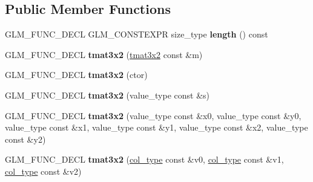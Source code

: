 \subsection*{Public Member Functions}
\begin{DoxyCompactItemize}
\item 
\hypertarget{structglm_1_1detail_1_1tmat3x2_a05bdf3c70f4246d2dad53a1fd3c09125}{}G\+L\+M\+\_\+\+F\+U\+N\+C\+\_\+\+D\+E\+C\+L G\+L\+M\+\_\+\+C\+O\+N\+S\+T\+E\+X\+P\+R size\+\_\+type {\bfseries length} () const \label{structglm_1_1detail_1_1tmat3x2_a05bdf3c70f4246d2dad53a1fd3c09125}

\item 
\hypertarget{structglm_1_1detail_1_1tmat3x2_aa5dbea756ecc0eeec0f8216ca548ad7f}{}G\+L\+M\+\_\+\+F\+U\+N\+C\+\_\+\+D\+E\+C\+L {\bfseries tmat3x2} (\hyperlink{structglm_1_1detail_1_1tmat3x2}{tmat3x2} const \&m)\label{structglm_1_1detail_1_1tmat3x2_aa5dbea756ecc0eeec0f8216ca548ad7f}

\item 
\hypertarget{structglm_1_1detail_1_1tmat3x2_a3d8f3014b4018f5f37c971851c5e7b16}{}G\+L\+M\+\_\+\+F\+U\+N\+C\+\_\+\+D\+E\+C\+L {\bfseries tmat3x2} (ctor)\label{structglm_1_1detail_1_1tmat3x2_a3d8f3014b4018f5f37c971851c5e7b16}

\item 
\hypertarget{structglm_1_1detail_1_1tmat3x2_ab49e902c0a394041a6d4c8f6b7b0a2c3}{}G\+L\+M\+\_\+\+F\+U\+N\+C\+\_\+\+D\+E\+C\+L {\bfseries tmat3x2} (value\+\_\+type const \&s)\label{structglm_1_1detail_1_1tmat3x2_ab49e902c0a394041a6d4c8f6b7b0a2c3}

\item 
\hypertarget{structglm_1_1detail_1_1tmat3x2_a28f71340efef5de0d7aac9da94ca4d40}{}G\+L\+M\+\_\+\+F\+U\+N\+C\+\_\+\+D\+E\+C\+L {\bfseries tmat3x2} (value\+\_\+type const \&x0, value\+\_\+type const \&y0, value\+\_\+type const \&x1, value\+\_\+type const \&y1, value\+\_\+type const \&x2, value\+\_\+type const \&y2)\label{structglm_1_1detail_1_1tmat3x2_a28f71340efef5de0d7aac9da94ca4d40}

\item 
\hypertarget{structglm_1_1detail_1_1tmat3x2_ab360bb1d2217122998f0c3bfc936c538}{}G\+L\+M\+\_\+\+F\+U\+N\+C\+\_\+\+D\+E\+C\+L {\bfseries tmat3x2} (\hyperlink{structglm_1_1detail_1_1tvec2}{col\+\_\+type} const \&v0, \hyperlink{structglm_1_1detail_1_1tvec2}{col\+\_\+type} const \&v1, \hyperlink{structglm_1_1detail_1_1tvec2}{col\+\_\+type} const \&v2)\label{structglm_1_1detail_1_1tmat3x2_ab360bb1d2217122998f0c3bfc936c538}


\end{DoxyCompactItemize}
